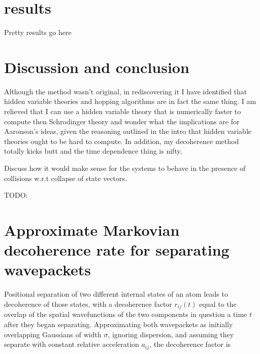 \section{results}
Pretty results go here

\section{Discussion and conclusion}

Although the method wasn't original, in rediscovering it I have identified that hidden variable theories and hopping algorithms are in fact the same thing. I am relieved that I can use a hidden variable theory that is numerically faster to compute then Schrodinger theory and wonder what the implications are for Aaronson's ideas, given the reasoning outlined in the intro that hidden variable theories ought to be hard to compute. In addition, my decoherence method totally kicks butt and the time dependence thing is nifty.

Discuss how it would make sense for the systems to behave in the presence of collisions w.r.t collapse of state vectors.

TODO:

\section{Approximate Markovian decoherence rate for separating wavepackets}

Positional separation of two different internal states of an atom leads to decoherence of those states, with a decoherence factor $r_{ij}(t)$ equal to the overlap of the spatial wavefunctions of the two components in question a time $t$ after they began separating. Approximating both wavepackets as initially overlapping Gaussians of width $\sigma$, ignoring dispersion, and assuming they separate with constant relative acceleration $a_{ij}$, the decoherence factor is

